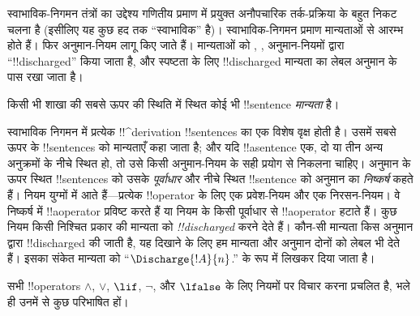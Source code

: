 \documentclass[../../../include/open-logic-section]{subfiles}
\begin{document}
      {}
      {}


\begin{explain}
स्वाभाविक-निगमन तंत्रों का उद्देश्य गणितीय प्रमाण में प्रयुक्त अनौपचारिक
तर्क-प्रक्रिया के बहुत निकट चलना है (इसीलिए यह कुछ हद तक ``स्वाभाविक'' है)।
स्वाभाविक-निगमन प्रमाण मान्यताओं से आरम्भ होते हैं। फिर अनुमान-नियम लागू किए
जाते हैं। मान्यताओं को \Intro{\lnot}, \Intro{\lif},  अनुमान-नियमों द्वारा
``!!{discharged}'' किया जाता है, और स्पष्टता के लिए !!{discharged} मान्यता का
लेबल अनुमान के पास रखा जाता है।
\end{explain}

\begin{defn}[मान्यता]
किसी भी शाखा की सबसे ऊपर की स्थिति में स्थित कोई भी !!{sentence}
\emph{मान्यता} है।
\end{defn}

स्वाभाविक निगमन में प्रत्येक !!^{derivation} !!{sentence}s का एक विशेष वृक्ष
होती है। उसमें सबसे ऊपर के !!{sentence}s को मान्यताएँ कहा जाता है; और यदि !!a{sentence} एक,
दो या तीन अन्य अनुक्रमों के नीचे स्थित हो, तो उसे किसी अनुमान-नियम के सही
प्रयोग से निकलना चाहिए। अनुमान के ऊपर स्थित !!{sentence}s को उसके
\emph{पूर्वाधार} और नीचे स्थित !!{sentence} को अनुमान का \emph{निष्कर्ष} कहते
हैं। नियम युग्मों में आते हैं—प्रत्येक !!{operator} के लिए एक प्रवेश-नियम और
एक निरसन-नियम। वे निष्कर्ष में !!a{operator} प्रविष्ट करते हैं या नियम के किसी
पूर्वाधार से !!a{operator} हटाते हैं। कुछ नियम किसी निश्चित प्रकार की मान्यता
को \emph{!!{discharged}} करने देते हैं। कौन-सी मान्यता किस अनुमान द्वारा
!!{discharged} की जाती है, यह दिखाने के लिए हम मान्यता और अनुमान दोनों को
लेबल भी देते हैं। इसका संकेत मान्यता को ``$\Discharge{!A}{n}$.'' के रूप में
लिखकर दिया जाता है।


%
	{सभी !!{operator}s $\land$, $\lor$, $\lif$, $\lnot$, और $\lfalse$ के लिए नियमों पर विचार करना प्रचलित है, भले ही उनमें से कुछ परिभाषित हों।}
\end{document}
